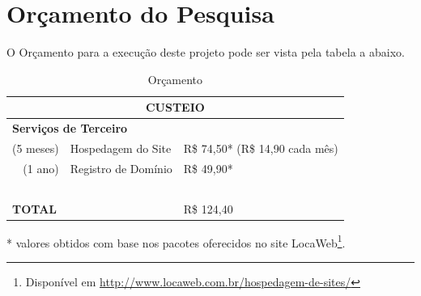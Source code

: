 \documentclass[
	12pt,				%
	openany,
	oneside,
	a4paper,			%
	english,			%
	brazil,				%
	]{abntex2}
\begin{document}





\chapter{Orçamento do Pesquisa}

O Orçamento para a execução deste projeto pode ser vista pela tabela a abaixo.
\begin{table}[H]
  \caption{Orçamento}
  \centering
  \begin{tabular}{|r l|l|}
    \hline 
    \multicolumn{3}{|c|}{\textsc{CUSTEIO}} \\ 
    \hline 
    \multicolumn{3}{|l|}{\textbf{Serviços de Terceiro}} \\ 
    \hline 
    (5 meses) & Hospedagem do Site & R\$ 74,50* (R\$ 14,90 cada mês) \\ 
    \hline 
    (1 ano) & Registro de Domínio & R\$ 49,90*   \\ 
    \hline 
    \multicolumn{3}{|c|}{\textsc{~}} \\ 
    \hline 
    \multicolumn{2}{|l|}{\textbf{TOTAL}} & R\$ 124,40\\ 
    \hline 
  \end{tabular} 
  \label{tab:orcamento}
\end{table}

* valores obtidos com base nos pacotes oferecidos no site LocaWeb\footnote{Disponível em \url{http://www.locaweb.com.br/hospedagem-de-sites/}}.





\end{document}
